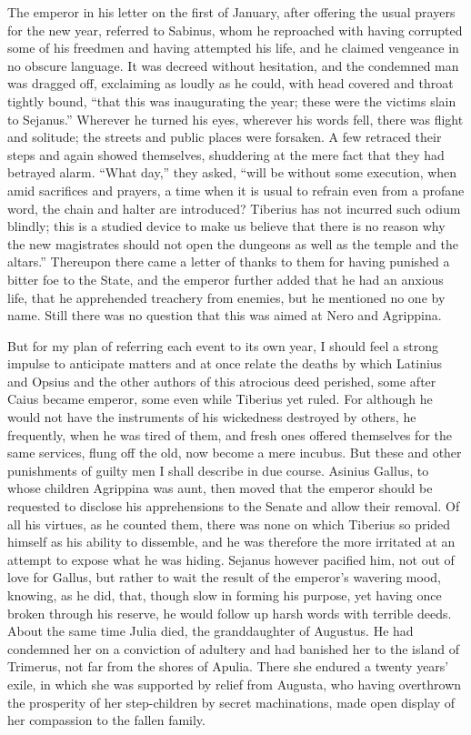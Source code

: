 
The emperor in his letter on the first of January, after offering the usual prayers for the new year, referred to Sabinus, whom he reproached with having corrupted some of his freedmen and having attempted his life, and he claimed vengeance in no obscure language. It was decreed without hesitation, and the condemned man was dragged off, exclaiming as loudly as he could, with head covered and throat tightly bound, ``that this was inaugurating the year; these were the victims slain to Sejanus.'' Wherever he turned his eyes, wherever his words fell, there was flight and solitude; the streets and public places were forsaken. A few retraced their steps and again showed themselves, shuddering at the mere fact that they had betrayed alarm. ``What day,'' they asked, ``will be without some execution, when amid sacrifices and prayers, a time when it is usual to refrain even from a profane word, the chain and halter are introduced? Tiberius has not incurred such odium blindly; this is a studied device to make us believe that there is no reason why the new magistrates should not open the dungeons as well as the temple and the altars.'' Thereupon there came a letter of thanks to them for having punished a bitter foe to the State, and the emperor further added that he had an anxious life, that he apprehended treachery from enemies, but he mentioned no one by name. Still there was no question that this was aimed at Nero and Agrippina.


But for my plan of referring each event to its own year, I should feel a strong impulse to anticipate matters and at once relate the deaths by which Latinius and Opsius and the other authors of this atrocious deed perished, some after Caius became emperor, some even while Tiberius yet ruled. For although he would not have the instruments of his wickedness destroyed by others, he frequently, when he was tired of them, and fresh ones offered themselves for the same services, flung off the old, now become a mere incubus. But these and other punishments of guilty men I shall describe in due course. Asinius Gallus, to whose children Agrippina was aunt, then moved that the emperor should be requested to disclose his apprehensions to the Senate and allow their removal. Of all his virtues, as he counted them, there was none on which Tiberius so prided himself as his ability to dissemble, and he was therefore the more irritated at an attempt to expose what he was hiding. Sejanus however pacified him, not out of love for Gallus, but rather to wait the result of the emperor's wavering mood, knowing, as he did, that, though slow in forming his purpose, yet having once broken through his reserve, he would follow up harsh words with terrible deeds. About the same time Julia died, the granddaughter of Augustus. He had condemned her on a conviction of adultery and had banished her to the island of Trimerus, not far from the shores of Apulia. There she endured a twenty years' exile, in which she was supported by relief from Augusta, who having overthrown the prosperity of her step-children by secret machinations, made open display of her compassion to the fallen family.

